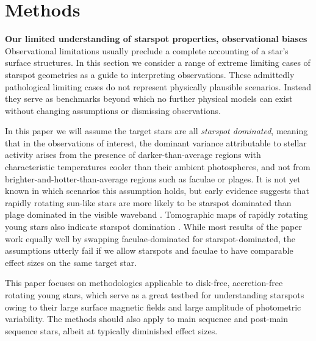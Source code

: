 \documentclass[twocolumn]{emulateapj}%
\begin{document}
\section{Methods}\label{sec:methods}

\textbf{Our limited understanding of starspot properties, observational biases}
Observational limitations usually preclude a complete accounting of a star's surface structures.  In this section we consider a range of extreme limiting cases of starspot geometries as a guide to interpreting observations.  These admittedly pathological limiting cases do not represent physically plausible scenarios.  Instead they serve as benchmarks beyond which no further physical models can exist without changing assumptions or dismissing observations.

In this paper we will assume the target stars are all \emph{starspot dominated}, meaning that in the observations of interest, the dominant variance attributable to stellar activity arises from the presence of darker-than-average regions with characteristic temperatures cooler than their ambient photospheres, and not from brighter-and-hotter-than-average regions such as faculae or plages.  It is not yet known in which scenarios this assumption holds, but early evidence suggests that rapidly rotating sun-like stars are more likely to be starspot dominated than plage dominated in the visible waveband \citep{2017ApJ...851..116M}.  Tomographic maps of rapidly rotating young stars also indicate starspot domination \citep{donati14}.  While most results of the paper work equally well by swapping faculae-dominated for starspot-dominated, the assumptions utterly fail if we allow starspots and faculae to have comparable effect sizes on the same target star.

This paper focuses on methodologies applicable to disk-free, accretion-free rotating young stars, which serve as a great testbed for understanding starspots owing to their large surface magnetic fields and large amplitude of photometric variability.  The methods should also apply to main sequence and post-main sequence stars, albeit at typically diminished effect sizes.
\end{document}
